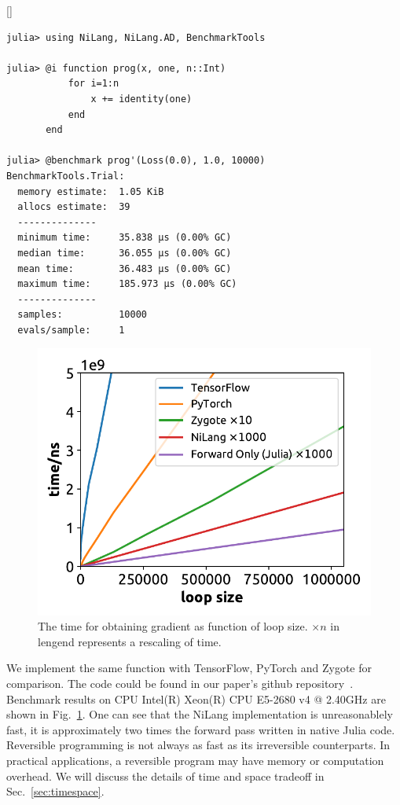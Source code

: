 \documentclass[aps,twocolumn,longbibliography,english,superscriptaddress]{revtex4-1}
\newcommand{\<}{\langle}
\renewcommand{\>}{\rangle}
\newcommand{\Fig}[1]{Fig.~\ref{#1}}
\newcommand{\Sec}[1]{Sec.~\ref{#1}}
\newcommand{\blue}[1]{[{\bf  \color{blue}{JG: #1}}]}
\theoremstyle{definition}\newtheorem{definition}{\textit{Definition}}
\begin{document}
\blue{Grammarly here!}

\begin{minipage}{.44\textwidth}
\begin{lstlisting}
julia> using NiLang, NiLang.AD, BenchmarkTools

julia> @i function prog(x, one, n::Int)
           for i=1:n
               x += identity(one)
           end
       end

julia> @benchmark prog'(Loss(0.0), 1.0, 10000)
BenchmarkTools.Trial: 
  memory estimate:  1.05 KiB
  allocs estimate:  39
  --------------
  minimum time:     35.838 μs (0.00% GC)
  median time:      36.055 μs (0.00% GC)
  mean time:        36.483 μs (0.00% GC)
  maximum time:     185.973 μs (0.00% GC)
  --------------
  samples:          10000
  evals/sample:     1
\end{lstlisting}
\end{minipage}

\begin{figure}
    \centerline{\includegraphics[width=0.9\columnwidth,trim={0 0cm 0 0},clip]{images/fig3.pdf}}
    \caption{The time for obtaining gradient as function of loop size. $\times n$ in lengend represents a rescaling of time.}\label{fig:benchmark}
\end{figure}
We implement the same function with TensorFlow, PyTorch and Zygote for comparison. The code could be found in our paper's github repository~\cite{benchmark}. Benchmark results on CPU Intel(R) Xeon(R) CPU E5-2680 v4 @ 2.40GHz are shown in \Fig{fig:benchmark}.
One can see that the NiLang implementation is unreasonablely fast, it is approximately two times the forward pass written in native Julia code.
Reversible programming is not always as fast as its irreversible counterparts. In practical applications, a reversible program may have memory or computation overhead. We will discuss the details of time and space tradeoff in \Sec{sec:timespace}.
\end{document}
